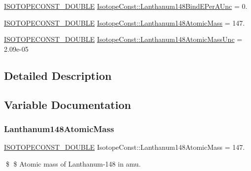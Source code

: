 \begin{DoxyCompactItemize}
\mbox{\hyperlink{group___isotope_const-_macros_ga8f45a7272ce02c0b4c65c44636ed719a}{I\+S\+O\+T\+O\+P\+E\+C\+O\+N\+S\+T\+\_\+\+D\+O\+U\+B\+LE}} \mbox{\hyperlink{group___isotope_const-_lanthanum-_la148_ga73ab59455846488c670b7d380523b6e9}{Isotope\+Const\+::\+Lanthanum148\+Bind\+E\+Per\+A\+Unc}} = 0.
\item 
\mbox{\hyperlink{group___isotope_const-_macros_ga8f45a7272ce02c0b4c65c44636ed719a}{I\+S\+O\+T\+O\+P\+E\+C\+O\+N\+S\+T\+\_\+\+D\+O\+U\+B\+LE}} \mbox{\hyperlink{group___isotope_const-_lanthanum-_la148_gac69c688be245732587cc98b9981be680}{Isotope\+Const\+::\+Lanthanum148\+Atomic\+Mass}} = 147.
\item 
\mbox{\hyperlink{group___isotope_const-_macros_ga8f45a7272ce02c0b4c65c44636ed719a}{I\+S\+O\+T\+O\+P\+E\+C\+O\+N\+S\+T\+\_\+\+D\+O\+U\+B\+LE}} \mbox{\hyperlink{group___isotope_const-_lanthanum-_la148_gae0b616f1712f5d72f439af9c06c6ede1}{Isotope\+Const\+::\+Lanthanum148\+Atomic\+Mass\+Unc}} = 2.\+09e-\/05
\end{DoxyCompactItemize}


\subsection{Detailed Description}


\subsection{Variable Documentation}
\mbox{\label{group___isotope_const-_lanthanum-_la148_gac69c688be245732587cc98b9981be680}} 
\subsubsection{\texorpdfstring{Lanthanum148\+Atomic\+Mass}{Lanthanum148AtomicMass}}
{\footnotesize\ttfamily \mbox{\hyperlink{group___isotope_const-_macros_ga8f45a7272ce02c0b4c65c44636ed719a}{I\+S\+O\+T\+O\+P\+E\+C\+O\+N\+S\+T\+\_\+\+D\+O\+U\+B\+LE}} Isotope\+Const\+::\+Lanthanum148\+Atomic\+Mass = 147.}

\$ \$ Atomic mass of Lanthanum-\/148 in amu. \mbox{\label{group___isotope_const-_lanthanum-_la148_gae0b616f1712f5d72f439af9c06c6ede1}} 
